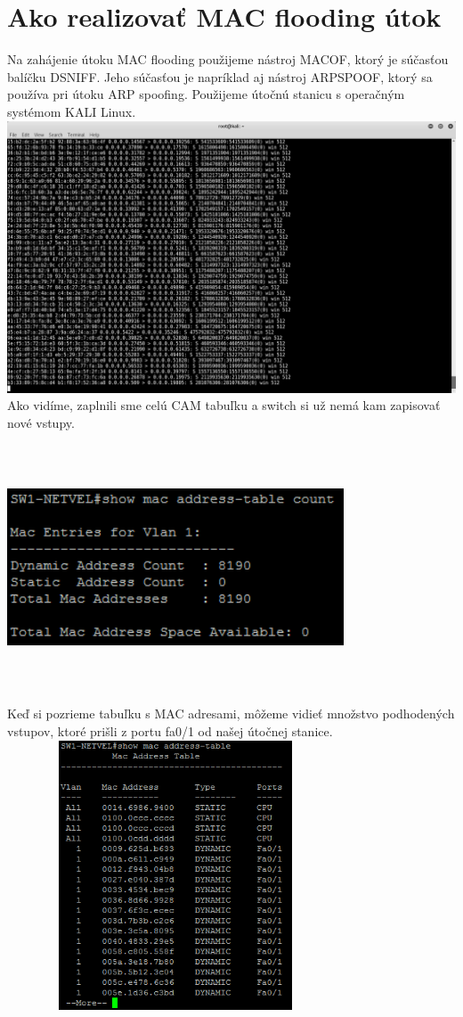 \section{Ako realizovať MAC flooding útok}
Na zahájenie útoku MAC flooding použijeme nástroj MACOF, ktorý je súčasťou balíčku DSNIFF. Jeho súčasťou je napríklad aj nástroj ARPSPOOF, ktorý sa používa pri útoku ARP spoofing. Použijeme útočnú stanicu s operačným systémom KALI Linux.\\
\includegraphics[width=\textwidth]{macof}
\newpage
Ako vidíme, zaplnili sme celú CAM tabuľku a switch si už nemá kam zapisovať nové vstupy.
\\
\includegraphics[width=10cm, height=8cm]{macof2}
\\
Keď si pozrieme tabuľku s MAC adresami, môžeme vidieť množstvo podhodených vstupov, ktoré prišli z portu fa0/1 od našej útočnej stanice.
\\
\includegraphics[width=10cm, height=8cm]{macof3}
